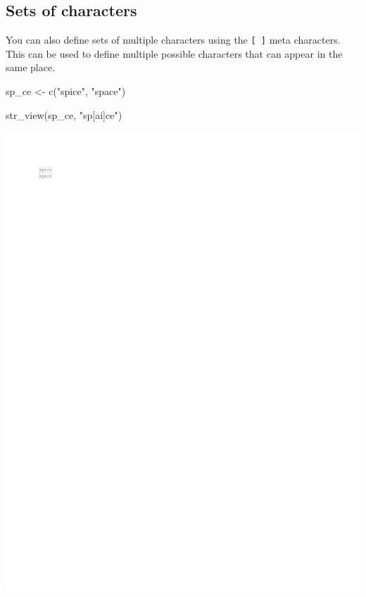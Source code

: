 \documentclass[
]{book}
\newenvironment{Shaded}{\begin{snugshade}}{\end{snugshade}}
\newcommand{\FunctionTok}[1]{\textcolor[rgb]{0.00,0.00,0.00}{#1}}
\newcommand{\NormalTok}[1]{#1}
\newcommand{\OtherTok}[1]{\textcolor[rgb]{0.56,0.35,0.01}{#1}}
\newcommand{\StringTok}[1]{\textcolor[rgb]{0.31,0.60,0.02}{#1}}
\begin{document}
\hypertarget{sets-of-characters}{%
\subsection{Sets of characters}\label{sets-of-characters}}

You can also define sets of multiple characters using the \texttt{{[}\ {]}} meta characters. This can be used to define multiple possible characters that can appear in the same place.

\begin{Shaded}
\begin{Highlighting}[]
\NormalTok{sp\_ce }\OtherTok{\textless{}{-}} \FunctionTok{c}\NormalTok{(}\StringTok{"spice"}\NormalTok{, }\StringTok{"space"}\NormalTok{)}

\FunctionTok{str\_view}\NormalTok{(sp\_ce, }\StringTok{"sp[ai]ce"}\NormalTok{)}
\end{Highlighting}
\end{Shaded}

\includegraphics{_main_files/figure-latex/unnamed-chunk-28-1.pdf}
\end{document}
